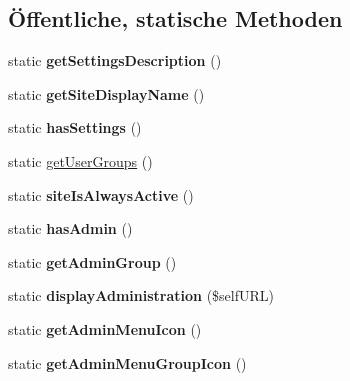 \subsection*{Öffentliche, statische Methoden}
\begin{DoxyCompactItemize}
\item 
\mbox{\label{class_message_send_rights_a807a152d46bb118732b7ed94c1e7a170}} 
static {\bfseries get\+Settings\+Description} ()
\item 
\mbox{\label{class_message_send_rights_a7158259efa0e716751180dcf41ac0ec9}} 
static {\bfseries get\+Site\+Display\+Name} ()
\item 
\mbox{\label{class_message_send_rights_a564076e1f26c81e07c3b407f0b3ed28c}} 
static {\bfseries has\+Settings} ()
\item 
static \mbox{\hyperlink{class_message_send_rights_a3da5ad26d9f72306b8a54345eb5128d0}{get\+User\+Groups}} ()
\item 
\mbox{\label{class_message_send_rights_a4f96f0147393c305daf4b5c11c5a187f}} 
static {\bfseries site\+Is\+Always\+Active} ()
\item 
\mbox{\label{class_message_send_rights_ad416811ab9638b7028ac434ec3465205}} 
static {\bfseries has\+Admin} ()
\item 
\mbox{\label{class_message_send_rights_a951942be4cfbe5dc26bdb632769772a6}} 
static {\bfseries get\+Admin\+Group} ()
\item 
\mbox{\label{class_message_send_rights_ad468f2f25745c7a4c7d0a16154e1531a}} 
static {\bfseries display\+Administration} (\$self\+U\+RL)
\item 
\mbox{\label{class_message_send_rights_a3d695b1332a02d1a9f93ae19d7b8cc6f}} 
static {\bfseries get\+Admin\+Menu\+Icon} ()
\item 
\mbox{\label{class_message_send_rights_a171d13fc1684c9dc7c782d6c5acbd64c}} 
static {\bfseries get\+Admin\+Menu\+Group\+Icon} ()

\end{DoxyCompactItemize}
